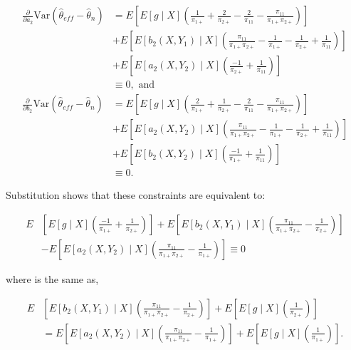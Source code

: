 \documentclass[12pt]{article}
\newcommand{\Var}{{\text{Var}}}
\begin{document}
\begin{itemize}
    \begin{align*}
      \frac{\partial}{\partial a_2} \Var(\hat \theta_{eff} - \hat \theta_n)
      &= E\left[E[g \mid X] \left(\frac{1}{\pi_{1+}} + \frac{2}{\pi_{2+}} -
      \frac{2}{\pi_{11}} - \frac{\pi_{11}}{\pi_{1+} \pi_{2+}}\right)\right] \\
      &+ E\left[E[b_2(X, Y_1) \mid X] \left(\frac{\pi_{11}}{\pi_{1+} \pi_{2+}} -
      \frac{1}{\pi_{1+}} - \frac{1}{\pi_{2+}} +
      \frac{1}{\pi_{11}}\right)\right]\\
      &+ E\left[ E[a_2(X, Y_2) \mid X] \left(\frac{-1}{\pi_{2+}} +
      \frac{1}{\pi_{11}}\right)\right]\\
      &\equiv 0, \text{ and }\\
      \frac{\partial}{\partial b_2} \Var(\hat \theta_{eff} - \hat \theta_n)
      &= E\left[E[g \mid X] \left(\frac{2}{\pi_{1+}} + \frac{1}{\pi_{2+}} -
      \frac{2}{\pi_{11}} - \frac{\pi_{11}}{\pi_{1+}\pi_{2+}}\right)\right]\\
      &+ E\left[E[a_2(X, Y_2) \mid X] \left(\frac{\pi_{11}}{\pi_{1+} \pi_{2+}} -
      \frac{1}{\pi_{1+}} - \frac{1}{\pi_{2+}} +
      \frac{1}{\pi_{11}}\right)\right]\\
      &+ E\left[ E[b_2(X, Y_2) \mid X] \left(\frac{-1}{\pi_{1+}} +
      \frac{1}{\pi_{11}}\right)\right]\\
      &\equiv 0. 
    \end{align*}


    Substitution shows that these constraints are equivalent to:

    \begin{align*}
      E&\left[E[g \mid X] \left(\frac{-1}{\pi_{1+}} +
    \frac{1}{\pi_{2+}}\right)\right] + E\left[ E[b_2(X, Y_1) \mid X]
    \left(\frac{\pi_{11}}{\pi_{1+} \pi_{2+}} -\frac{1}{\pi_{2+}}\right)\right]\\
      &- E\left[E[a_2(X, Y_2) \mid X] \left(\frac{\pi_{11}}{\pi_{1+} \pi_{2+}} - 
    \frac{1}{\pi_{1+}}\right)\right] \equiv 0
    \end{align*}

    where is the same as,

    \begin{align*}
      E&\left[ E[b_2(X, Y_1) \mid X] \left(\frac{\pi_{11}}{\pi_{1+} \pi_{2+}} -
    \frac{1}{\pi_{2+}}\right) \right] + E\left[E[g \mid X]
      \left(\frac{1}{\pi_{2+}}\right)\right] \\
      &=
    E\left[ E[a_2(X, Y_2) \mid X] \left(\frac{\pi_{11}}{\pi_{1+} \pi_{2+}} -
    \frac{1}{\pi_{1+}}\right) \right] + E\left[E[g \mid X]
    \left(\frac{1}{\pi_{1+}}\right)\right].
    \end{align*}


\end{itemize}
\end{document}
